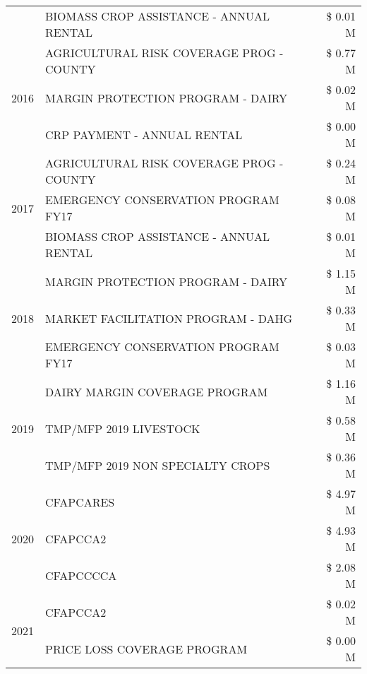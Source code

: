 \begin{tabular}{llr}
 & BIOMASS CROP ASSISTANCE - ANNUAL RENTAL & \$ 0.01 M \\
\cline{1-3}
\multirow[t]{3}{*}{2016} & AGRICULTURAL RISK COVERAGE PROG - COUNTY & \$ 0.77 M \\
 & MARGIN PROTECTION PROGRAM - DAIRY & \$ 0.02 M \\
 & CRP PAYMENT - ANNUAL RENTAL & \$ 0.00 M \\
\cline{1-3}
\multirow[t]{3}{*}{2017} & AGRICULTURAL RISK COVERAGE PROG - COUNTY & \$ 0.24 M \\
 & EMERGENCY CONSERVATION PROGRAM FY17 & \$ 0.08 M \\
 & BIOMASS CROP ASSISTANCE - ANNUAL RENTAL & \$ 0.01 M \\
\cline{1-3}
\multirow[t]{3}{*}{2018} & MARGIN PROTECTION PROGRAM - DAIRY & \$ 1.15 M \\
 & MARKET FACILITATION PROGRAM - DAHG & \$ 0.33 M \\
 & EMERGENCY CONSERVATION PROGRAM FY17 & \$ 0.03 M \\
\cline{1-3}
\multirow[t]{3}{*}{2019} & DAIRY MARGIN COVERAGE PROGRAM & \$ 1.16 M \\
 & TMP/MFP 2019 LIVESTOCK & \$ 0.58 M \\
 & TMP/MFP 2019 NON SPECIALTY CROPS & \$ 0.36 M \\
\cline{1-3}
\multirow[t]{3}{*}{2020} & CFAPCARES & \$ 4.97 M \\
 & CFAPCCA2 & \$ 4.93 M \\
 & CFAPCCCCA & \$ 2.08 M \\
\cline{1-3}
\multirow[t]{2}{*}{2021} & CFAPCCA2 & \$ 0.02 M \\
 & PRICE LOSS COVERAGE PROGRAM & \$ 0.00 M \\
\cline{1-3}
\bottomrule
\end{tabular}
